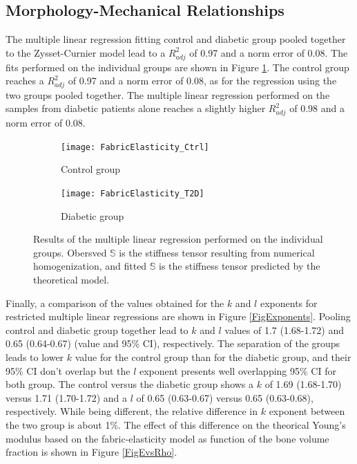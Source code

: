 \documentclass[a4paper,fleqn]{DC_ArtStyle}
\begin{document}
	\subsection{Morphology-Mechanical Relationships}
	The multiple linear regression fitting control and diabetic group pooled together to the Zysset-Curnier model lead to a $R_{adj}^{2}$ of 0.97 and a norm error of 0.08.
	The fits performed on the individual groups are shown in Figure \ref{FigLinReg}.
	The control group reaches a $R_{adj}^{2}$ of 0.97 and a norm error of 0.08, as for the regression using the two groups pooled together.
	The multiple linear regression performed on the samples from diabetic patients alone reaches a slightly higher $R_{adj}^{2}$ of 0.98 and a norm error of 0.08.
	\\[0.5em]

	\begin{figure}
		\centering
		\begin{subfigure}[b]{0.45\linewidth}
			\texttt{[image: FabricElasticity\_Ctrl]}
			\caption{Control group}
		\end{subfigure}\hfill
		\begin{subfigure}[b]{0.45\linewidth}
			\texttt{[image: FabricElasticity\_T2D]}
			\caption{Diabetic group}
		\end{subfigure}
		\caption{Results of the multiple linear regression performed on the individual groups.
				 Obersved $\mathbb{S}$ is the stiffness tensor resulting from numerical homogenization, and fitted $\mathbb{S}$ is the stiffness tensor predicted by the theoretical model.}
		\label{FigLinReg}
	\end{figure}

	Finally, a comparison of the values obtained for the $k$ and $l$ exponents for restricted multiple linear regressions are shown in Figure \ref{FigExponents}.
	Pooling control and diabetic group together lead to $k$ and $l$ values of 1.7 (1.68-1.72) and 0.65 (0.64-0.67) (value and 95\% CI), respectively.
	The separation of the groups leads to lower $k$ value for the control group than for the diabetic group, and their 95\% CI don't overlap but the $l$ exponent presents well overlapping 95\% CI for both group.
	The control versus the diabetic group shows a $k$ of 1.69 (1.68-1.70) versus 1.71 (1.70-1.72) and a $l$ of 0.65 (0.63-0.67) versus 0.65 (0.63-0.68), respectively.
	While being different, the relative difference in $k$ exponent between the two group is about 1\%.
	The effect of this difference on the theorical Young's modulus based on the fabric-elasticity model as function of the bone volume fraction is shown in Figure \ref{FigEvsRho}.
   
\end{document}
